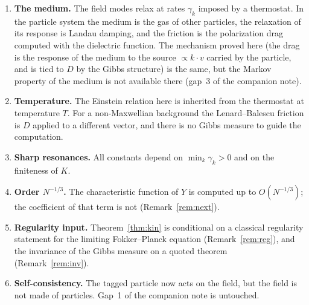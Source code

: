 \documentclass[11pt]{article}
\theoremstyle{remark}
\begin{document}
\begin{enumerate}
  \item \textbf{The medium.} The field modes relax at rates $\gamma_k$
    imposed by a thermostat. In the particle system the medium is the gas of
    other particles, the relaxation of its response is Landau damping, and
    the friction is the polarization drag
    computed with the dielectric function. The mechanism proved here (the
    drag is the response of the medium to the source $\propto k\cdot v$
    carried by the particle, and is tied to $D$ by the Gibbs structure) is
    the same, but the Markov property of the medium is not available there
    (gap~3 of the companion note).
  \item \textbf{Temperature.} The Einstein relation here is inherited from
    the thermostat at temperature $T$. For a non-Maxwellian background the
    Lenard--Balescu friction is $D$ applied to a different vector, and
    there is no Gibbs measure to guide the computation.
  \item \textbf{Sharp resonances.} All constants depend on
    $\min_k\gamma_k>0$ and on the finiteness of $K$.
  \item \textbf{Order $N^{-1/3}$.} The characteristic function of $Y$ is
    computed up to $O(N^{-1/3})$; the coefficient of that term is not
    (Remark~\ref{rem:next}).
  \item \textbf{Regularity input.} Theorem~\ref{thm:kin} is conditional on a
    classical regularity statement for the limiting Fokker--Planck equation
    (Remark~\ref{rem:reg}), and the invariance of the Gibbs measure on a
    quoted theorem (Remark~\ref{rem:inv}).
  \item \textbf{Self-consistency.} The tagged particle now acts on the
    field, but the field is not made of particles. Gap~1 of the companion
    note is untouched.
\end{enumerate}
\end{document}
